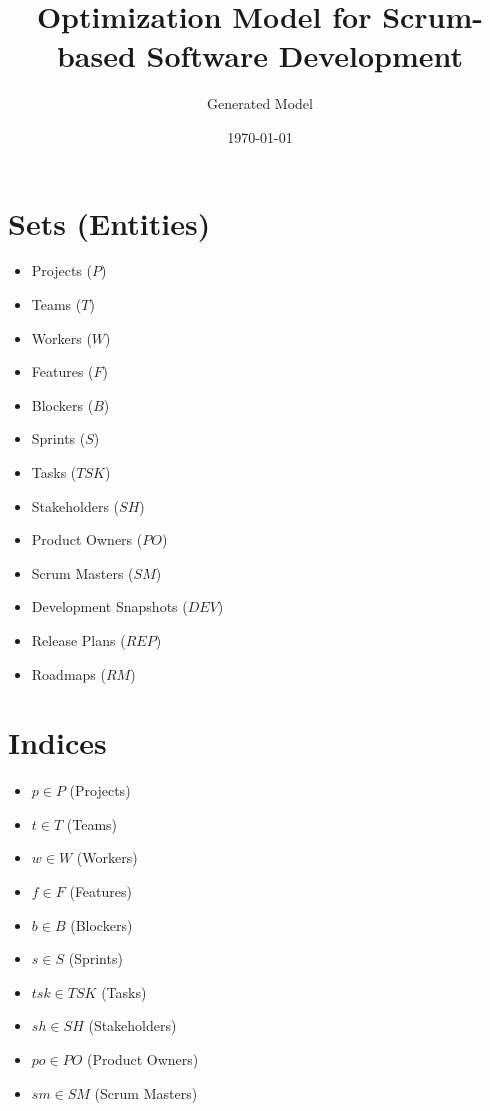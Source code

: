 \documentclass{article}
\title{Optimization Model for Scrum-based Software Development}
\author{Generated Model}
\date{\today}
\begin{document}
\maketitle
\tableofcontents

\section{Sets (Entities)}
\begin{itemize}
    \item Projects ($P$)
    \item Teams ($T$)
    \item Workers ($W$)
    \item Features ($F$)
    \item Blockers ($B$)
    \item Sprints ($S$)
    \item Tasks ($TSK$)
    \item Stakeholders ($SH$)
    \item Product Owners ($PO$)
    \item Scrum Masters ($SM$)
    \item Development Snapshots ($DEV$)
    \item Release Plans ($REP$)
    \item Roadmaps ($RM$)
\end{itemize}

\section{Indices}
\begin{itemize}
    \item $p \in P$ (Projects)
    \item $t \in T$ (Teams)
    \item $w \in W$ (Workers)
    \item $f \in F$ (Features)
    \item $b \in B$ (Blockers)
    \item $s \in S$ (Sprints)
    \item $tsk \in TSK$ (Tasks)
    \item $sh \in SH$ (Stakeholders)
    \item $po \in PO$ (Product Owners)
    \item $sm \in SM$ (Scrum Masters)
\end{itemize}
\end{document}
